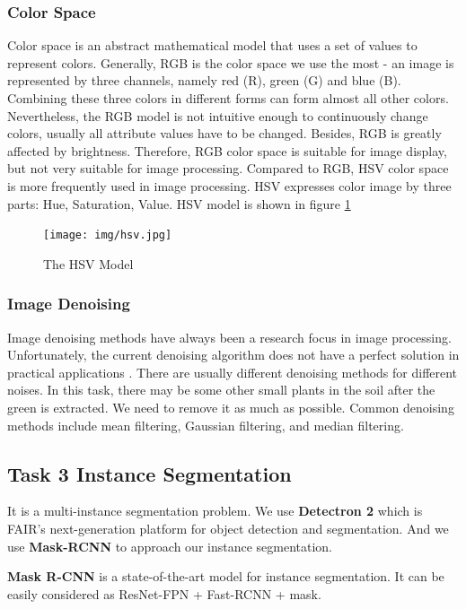 \documentclass[conference]{IEEEtran}
\begin{document}
\subsubsection{Color Space}
Color space is an abstract mathematical model that uses a set of values to represent colors. Generally, RGB is the color space we use the most - an image is represented by three channels, namely red (R), green (G) and blue (B). Combining these three colors in different forms can form almost all other colors. Nevertheless, the RGB model is not intuitive enough to continuously change colors, usually all attribute values have to be changed. Besides, RGB is greatly affected by brightness. Therefore, RGB color space is suitable for image display, but not very suitable for image processing. Compared to RGB, HSV color space is more frequently used in image processing. HSV expresses color image by three parts: Hue, Saturation, Value. HSV model is shown in figure \ref{fig_HSV_model}

\begin{figure}
    \centering
    \texttt{[image: img/hsv.jpg]}
    \caption{The HSV Model}
    \label{fig_HSV_model}
\end{figure}

\subsubsection{Image Denoising}
Image denoising methods have always been a research focus in image processing. Unfortunately, the current denoising algorithm does not have a perfect solution in practical applications \cite{buades2005review}. There are usually different denoising methods for different noises. In this task, there may be some other small plants in the soil after the green is extracted. We need to remove it as much as possible. Common denoising methods include mean filtering, Gaussian filtering, and median filtering. 


\subsection{Task 3 Instance Segmentation}

It is a multi-instance segmentation problem. We use \textbf{Detectron 2}\cite{wu2019detectron2} which is FAIR's next-generation platform for object detection and segmentation. And we use \textbf{Mask-RCNN}\cite{He_2017} to approach our instance segmentation.

\textbf{Mask R-CNN} is a state-of-the-art model for instance segmentation. It can be easily considered as ResNet-FPN + Fast-RCNN + mask.
\end{document}
